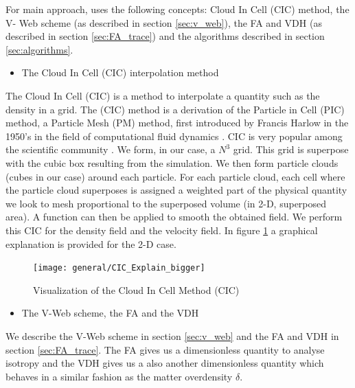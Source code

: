 \documentclass[12pt]{article}
\begin{document}
\begin{par}
For main approach, uses the
 following concepts: Cloud In Cell (CIC) method, the V-
 Web scheme (as described in section \ref{sec:v_web}),
  the FA and VDH (as described in
   section \ref{sec:FA_trace}) and the algorithms described
       in section \ref{sec:algorithms}.\\
\end{par}


\begin{itemize}
\item The Cloud In Cell (CIC) interpolation method
\end{itemize}
\begin{par}
The Cloud In Cell (CIC) is a method to interpolate a
 quantity such as the density in a grid. The (CIC) method
 is a derivation of the
 Particle in Cell (PIC) method, a Particle Mesh (PM)
  method, first introduced by Francis Harlow in the
   1950's in the field of computational fluid dynamics
    \cite{harlow1964particle}. CIC is very popular
     among the scientific community
      \cite{grigoryev_numerical_2002}. We form, in our
       case, a $N^3$ grid. This grid is superpose with
        the cubic
      box resulting from the simulation. We then form
       particle clouds (cubes in our case) around each
        particle. For each particle cloud, each cell
         where the particle cloud superposes is
          assigned a weighted part of the physical
           quantity we look to mesh proportional to the
            superposed volume (in 2-D, superposed
             area). A function can then be applied to
              smooth the obtained field. We perform
               this CIC
            for the density field and the velocity
             field. In figure \ref{fg:cic_explain} a
              graphical explanation is provided for the
               2-D case.  \\
\end{par}

\begin{figure}[ht]
\begin{center}
\texttt{[image: general/CIC\_Explain\_bigger]} %
\caption{Visualization of the Cloud In Cell Method (CIC)}
\label{fg:cic_explain}
\end{center}
\end{figure}
\FloatBarrier

\begin{itemize}
\item The V-Web scheme, the FA and the VDH
\end{itemize}
\begin{par}
We describe the V-Web scheme in section \ref{sec:v_web}
 and the FA and VDH in section \ref{sec:FA_trace}.
The FA gives us a dimensionless quantity to analyse
 isotropy and the VDH gives us a also another
  dimensionless quantity which behaves in a similar
   fashion as the matter overdensity $\delta$.
\end{par}
\end{document}
